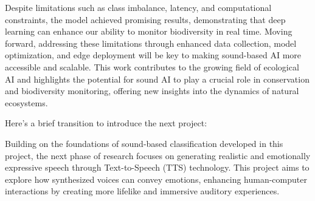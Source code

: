 Despite limitations such as class imbalance, latency, and computational constraints, the model achieved promising results, demonstrating that deep learning can enhance our ability to monitor biodiversity in real time. Moving forward, addressing these limitations through enhanced data collection, model optimization, and edge deployment will be key to making sound-based AI more accessible and scalable. This work contributes to the growing field of ecological AI and highlights the potential for sound AI to play a crucial role in conservation and biodiversity monitoring, offering new insights into the dynamics of natural ecosystems.


Here’s a brief transition to introduce the next project:

Building on the foundations of sound-based classification developed in this project, the next phase of research focuses on generating realistic and emotionally expressive speech through Text-to-Speech (TTS) technology. This project aims to explore how synthesized voices can convey emotions, enhancing human-computer interactions by creating more lifelike and immersive auditory experiences.

